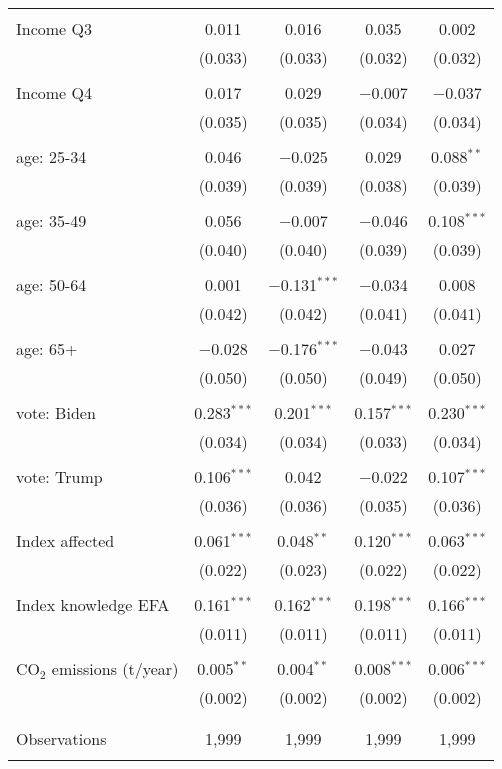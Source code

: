 \begin{tabular}{@{\extracolsep{5pt}}lcccc}
  & & & & \\ 
 Income Q3 & 0.011 & 0.016 & 0.035 & 0.002 \\ 
  & (0.033) & (0.033) & (0.032) & (0.032) \\ 
  & & & & \\ 
 Income Q4 & 0.017 & 0.029 & $-$0.007 & $-$0.037 \\ 
  & (0.035) & (0.035) & (0.034) & (0.034) \\ 
  & & & & \\ 
 age: 25-34 & 0.046 & $-$0.025 & 0.029 & 0.088$^{**}$ \\ 
  & (0.039) & (0.039) & (0.038) & (0.039) \\ 
  & & & & \\ 
 age: 35-49 & 0.056 & $-$0.007 & $-$0.046 & 0.108$^{***}$ \\ 
  & (0.040) & (0.040) & (0.039) & (0.039) \\ 
  & & & & \\ 
 age: 50-64 & 0.001 & $-$0.131$^{***}$ & $-$0.034 & 0.008 \\ 
  & (0.042) & (0.042) & (0.041) & (0.041) \\ 
  & & & & \\ 
 age: 65+ & $-$0.028 & $-$0.176$^{***}$ & $-$0.043 & 0.027 \\ 
  & (0.050) & (0.050) & (0.049) & (0.050) \\ 
  & & & & \\ 
 vote: Biden & 0.283$^{***}$ & 0.201$^{***}$ & 0.157$^{***}$ & 0.230$^{***}$ \\ 
  & (0.034) & (0.034) & (0.033) & (0.034) \\ 
  & & & & \\ 
 vote: Trump & 0.106$^{***}$ & 0.042 & $-$0.022 & 0.107$^{***}$ \\ 
  & (0.036) & (0.036) & (0.035) & (0.036) \\ 
  & & & & \\ 
 Index affected & 0.061$^{***}$ & 0.048$^{**}$ & 0.120$^{***}$ & 0.063$^{***}$ \\ 
  & (0.022) & (0.023) & (0.022) & (0.022) \\ 
  & & & & \\ 
 Index knowledge EFA & 0.161$^{***}$ & 0.162$^{***}$ & 0.198$^{***}$ & 0.166$^{***}$ \\ 
  & (0.011) & (0.011) & (0.011) & (0.011) \\ 
  & & & & \\ 
 CO$_{2}$ emissions (t/year) & 0.005$^{**}$ & 0.004$^{**}$ & 0.008$^{***}$ & 0.006$^{***}$ \\ 
  & (0.002) & (0.002) & (0.002) & (0.002) \\ 
  & & & & \\ 
\hline \\[-1.8ex] 

Observations & 1,999 & 1,999 & 1,999 & 1,999 \\ 
\hline 
\hline \\[-1.8ex] 
\end{tabular} 
